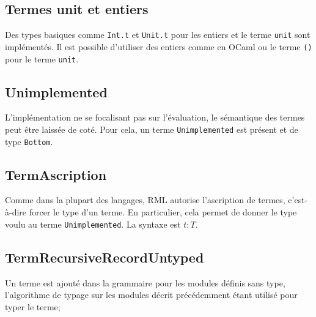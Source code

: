 \subsection*{Termes unit et entiers}

Des types basiques comme \verb|Int.t| et \verb|Unit.t| pour les entiers et le terme
\verb|unit| sont implémentés. Il est possible d'utiliser des entiers comme en
OCaml ou le terme \verb|()| pour le terme \verb|unit|.

\subsection*{Unimplemented}

L'implémentation ne se focalisant pas sur l'évaluation, le sémantique des termes
peut être laissée de coté. Pour cela, un terme \verb|Unimplemented| est présent
et de type \verb|Bottom|.

\subsection*{TermAscription}

Comme dans la plupart des langages, RML autorise l'ascription de termes,
c'est-à-dire forcer le type d'un terme. En particulier, cela permet de donner le
type voulu au terme \verb|Unimplemented|. La syntaxe est $t : T$.

\subsection*{TermRecursiveRecordUntyped}

Un terme est ajouté dans la grammaire pour les modules définis sans type,
l'algorithme de typage sur les modules décrit précédemment étant utilisé pour
typer le terme;


%
%
%

